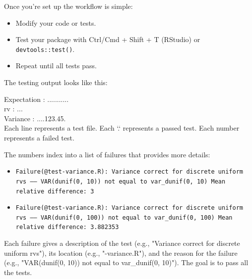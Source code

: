 \documentclass[12pt,handout]{beamer}
\begin{document}
\begin{frame}[fragile]
Once you're set up the workflow is simple:

\begin{itemize}
\item  Modify your code or tests.

\item  Test your package with Ctrl/Cmd + Shift + T (RStudio) or \texttt{devtools::test()}.

\item  Repeat until all tests pass.

\end{itemize}


\end{frame}



\begin{frame}[fragile]
The testing output looks like this:

    Expectation : ........... \\
    rv : ... \\
    Variance : ....123.45. \\

Each line represents a test file. Each `.` represents a passed test. Each number represents a failed test. 

\end{frame}



\begin{frame}[fragile]
The numbers index into a list of failures that provides more details:
\begin{itemize}

    \item \texttt{Failure(@test-variance.R): Variance correct for discrete uniform rvs -----
    VAR(dunif(0, 10)) not equal to var\_dunif(0, 10)
    Mean relative difference: 3}
    
    \item \texttt{Failure(@test-variance.R): Variance correct for discrete uniform rvs -----
    VAR(dunif(0, 100)) not equal to {var\_dunif(0, 100)}
    Mean relative difference: 3.882353}

\end{itemize}

Each failure gives a description of the test (e.g., "Variance correct for discrete uniform rvs"),
 its location (e.g., "\@test-variance.R"), and the reason for the failure (e.g., "VAR(dunif(0, 10))
 not equal to var\_dunif(0, 10)"). The goal is to pass all the tests.
\end{frame}
\end{document}
